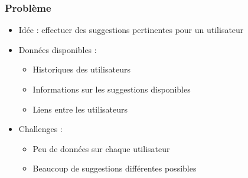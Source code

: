 \documentclass[c]{beamer}
\author{Igor Colin}
\date{\today}
\begin{document}
\begin{frame}
    \frametitle{Problème}

    \begin{itemize}
        \item Id\'ee : effectuer des suggestions pertinentes pour un
            utilisateur
        \item Donn\'ees disponibles :
            \begin{itemize}
                \item Historiques des utilisateurs
                \item Informations sur les suggestions disponibles
                \item Liens entre les utilisateurs
            \end{itemize}
        \item Challenges :
            \begin{itemize}
                \item Peu de donn\'ees sur chaque utilisateur
                \item Beaucoup de suggestions diff\'erentes possibles
            \end{itemize}
    \end{itemize}
\end{frame}
\end{document}
